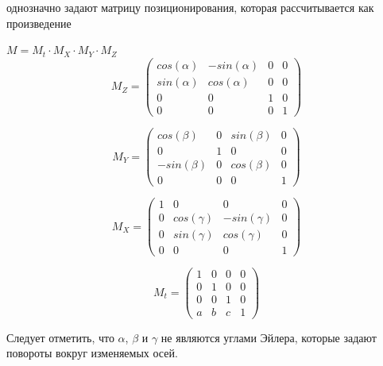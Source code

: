 однозначно задают матрицу позиционирования, которая рассчитывается как произведение

{\centering
$M = M_t \cdot M_X \cdot M_Y \cdot M_Z$ \\

\[
M_Z=
\begin{pmatrix}
cos(\alpha) & -sin(\alpha) & 0 & 0 \\
sin(\alpha) & cos(\alpha) & 0 & 0 \\
0 & 0 & 1 & 0 \\
0 & 0 & 0 & 1
\end{pmatrix}
\]

\[
M_Y=
\begin{pmatrix}
cos(\beta) & 0 & sin(\beta) & 0 \\
0 & 1 & 0 & 0 \\
-sin(\beta) & 0 & cos(\beta) & 0 \\
0 & 0 & 0 & 1
\end{pmatrix}
\]

\[
M_X=
\begin{pmatrix}
1 & 0 & 0 & 0 \\
0 & cos(\gamma) & -sin(\gamma) & 0 \\
0 & sin(\gamma) & cos(\gamma) & 0  \\
0 & 0 & 0 & 1
\end{pmatrix}
\]

\[
M_t=
\begin{pmatrix}
1 & 0 & 0 & 0 \\
0 & 1 & 0 & 0 \\
0 & 0 & 1 & 0 \\
a & b & c & 1
\end{pmatrix}
\]

}

Следует отметить, что $\alpha$, $\beta$ и $\gamma$ не являются углами Эйлера, которые задают повороты вокруг изменяемых осей.

